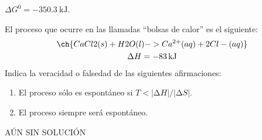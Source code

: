   \begin{solution}
    \( \Delta G^0 = \SI{-350.3}{\kilo\joule} \).
  \end{solution}




  \begin{exercise}[
      tags    = {termodinámica, espontaneidad, Gibbs},
      topics  = {química, termoquímica, termodinámica},
      source  = {},
    ]
    El proceso que ocurre en las llamadas “bolsas de calor” es el siguiente:
    \begin{multline*}
      \ch{CaCl2(s) + H2O(l) -> Ca^{2+}(aq) + 2 Cl-(aq)} \\
      \Delta H = \SI{-83}{\kilo\joule}
    \end{multline*}
    Indica la veracidad o falsedad de las siguientes afirmaciones:
    \begin{enumerate}
      \item El proceso sólo es espontáneo si \( T < |∆H|/|∆S| \).
      \item El proceso siempre será espontáneo.
    \end{enumerate}

  \end{exercise}

  \begin{solution}
    AÚN SIN SOLUCIÓN %
  \end{solution}




